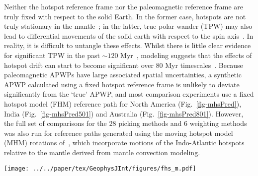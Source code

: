 Neither the hotspot reference frame nor the paleomagnetic reference frame are
truly fixed with respect to the solid Earth. In the former case, hotspots are
not truly stationary in the mantle~\citep{S98}; in the latter, true polar wander
(TPW) may also lead to differential movements of the solid earth with respect to
the spin axis~\citep{E03}. In reality, it is difficult to untangle these
effects. Whilst there is little clear evidence for significant TPW in the past
${\sim}120$ Myr~\citep{C00,R04}, modeling suggests that the effects of hotspot
drift can start to become significant over 80 Myr
timescales~\citep{O05}. Because paleomagnetic APWPs have large associated
spatial uncertainties, a synthetic APWP calculated using a fixed hotspot
reference frame is unlikely to deviate significantly from the `true' APWP, and
most comparison experiments use a fixed hotspot model (FHM) reference path for
North America (Fig.~\ref{fig-mhsPred}), India (Fig.~\ref{fig-mhsPred501}) and
Australia (Fig.~\ref{fig-mhsPred801}). However, the full set of comparisons for
the 28 picking methods and 6 weighting methods was also run for reference paths
generated using the moving hotspot model (MHM) rotations of~\citet{O05}, which
incorporate motions of the Indo-Atlantic hotspots relative to the mantle derived
from mantle convection modeling.

\begin{figure*}
\centering
\texttt{[image: ../../paper/tex/GeophysJInt/figures/fhs\_m.pdf]}
\caption[120 Ma MHM vs FHM predicted APWP of North America]{MHM
predicted 120 Ma APWP (solid line) for $NAC$ through the North
America\textendash{}Nubia\textendash{}Mantle plate circuit. The FHM predicted
path (dashed line with shaded uncertainties) is also shown for comparison. The
age step is 5 Myr. Compared with the 10 Ma paleomagnetic mean pole calculated by
the AMP method (dark triangle), the coeval mean pole derived from the APP method
is closer to both FHM and MHM predicted 10 Ma poles, which indicates more data
diluting the effect of outliers. See also the paleopoles that the two mean poles
are composed of in Fig.~\ref{fig-nac-maplat}.}\label{fig-mhsPred}
\end{figure*}

